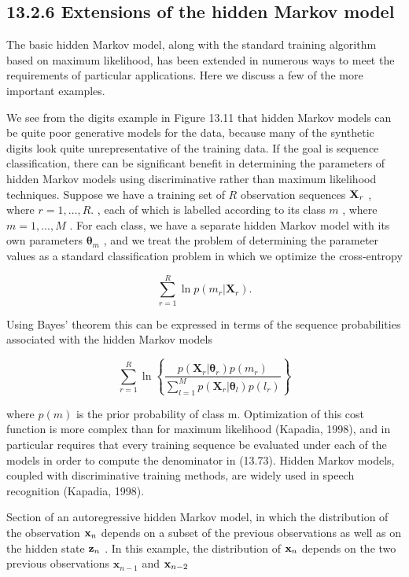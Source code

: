 \documentclass[
  10
]{article}
\begin{document}
\subsection{13.2.6 Extensions of the hidden Markov
model}\label{extensions-of-the-hidden-markov-model}

The basic hidden Markov model, along with the standard training
algorithm based on maximum likelihood, has been extended in numerous
ways to meet the requirements of particular applications. Here we
discuss a few of the more important examples.

We see from the digits example in Figure 13.11 that hidden Markov models
can be quite poor generative models for the data, because many of the
synthetic digits look quite unrepresentative of the training data. If
the goal is sequence classification, there can be significant benefit in
determining the parameters of hidden Markov models using discriminative
rather than maximum likelihood techniques. Suppose we have a training
set of \(R\) observation sequences \({ \bf X } _ { r }\) , where
\(r = 1 , \ldots , R .\) , each of which is labelled according to its
class \(m\) , where \(m = 1 , \ldots , M\) . For each class, we have a
separate hidden Markov model with its own parameters
\(\pmb { \theta } _ { m }\) , and we treat the problem of determining
the parameter values as a standard classification problem in which we
optimize the cross-entropy

\[
\sum_ {r = 1} ^ {R} \ln p (m _ {r} | \mathbf {X} _ {r}).\tag{13.72}
\]

Using Bayes' theorem this can be expressed in terms of the sequence
probabilities associated with the hidden Markov models

\[
\sum_ {r = 1} ^ {R} \ln \left\{\frac {p (\mathbf {X} _ {r} | \boldsymbol {\theta} _ {r}) p (m _ {r})}{\sum_ {l = 1} ^ {M} p (\mathbf {X} _ {r} | \boldsymbol {\theta} _ {l}) p (l _ {r})} \right\}\tag{13.73}
\]

where \(p ( m )\) is the prior probability of class m. Optimization of
this cost function is more complex than for maximum likelihood (Kapadia,
1998), and in particular requires that every training sequence be
evaluated under each of the models in order to compute the denominator
in (13.73). Hidden Markov models, coupled with discriminative training
methods, are widely used in speech recognition (Kapadia, 1998).

Section of an autoregressive hidden Markov model, in which the
distribution of the observation \({ \bf x } _ { n }\) depends on a
subset of the previous observations as well as on the hidden state
\({ \bf z } _ { n }\) . In this example, the distribution of
\({ \bf x } _ { n }\) depends on the two previous observations
\(\mathbf { x } _ { n - 1 }\) and \({ \bf x } _ { n - 2 }\)
\end{document}
